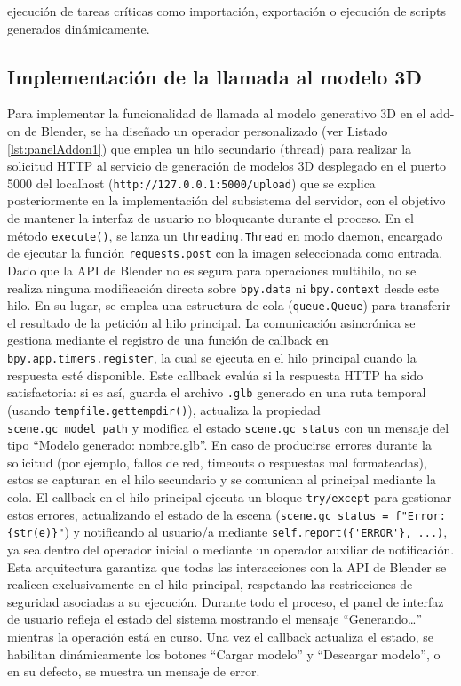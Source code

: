 ejecución de tareas críticas como importación, exportación o ejecución de scripts generados dinámicamente.




\subsection{Implementación de la llamada al modelo 3D}
Para implementar la funcionalidad de llamada al modelo generativo 3D en el add-on de Blender, se ha diseñado un operador personalizado (ver Listado \ref{lst:panelAddon1}) que emplea un hilo secundario (thread) para realizar la solicitud HTTP al servicio de generación de modelos 3D desplegado en el puerto 5000 del localhost (\verb|http://127.0.0.1:5000/upload|) que se explica posteriormente en la implementación del subsistema del servidor, con el objetivo de mantener la interfaz de usuario no bloqueante durante el proceso. En el método \verb|execute()|, se lanza un \verb|threading.Thread| en modo daemon, encargado de ejecutar la función \verb|requests.post| con la imagen seleccionada como entrada. Dado que la API de Blender no es segura para operaciones multihilo, no se realiza ninguna modificación directa sobre \verb|bpy.data| ni \verb|bpy.context| desde este hilo. En su lugar, se emplea una estructura de cola (\verb|queue.Queue|) para transferir el resultado de la petición al hilo principal. La comunicación asincrónica se gestiona mediante el registro de una función de callback en \verb|bpy.app.timers.register|, la cual se ejecuta en el hilo principal cuando la respuesta esté disponible. Este callback evalúa si la respuesta HTTP ha sido satisfactoria: si es así, guarda el archivo \verb|.glb| generado en una ruta temporal (usando \verb|tempfile.gettempdir()|), actualiza la propiedad\\ \verb|scene.gc_model_path| y modifica el estado \verb|scene.gc_status| con un mensaje del tipo “Modelo generado: nombre.glb”. En caso de producirse errores durante la solicitud (por ejemplo, fallos de red, timeouts o respuestas mal formateadas), estos se capturan en el hilo secundario y se comunican al principal mediante la cola. El callback en el hilo principal ejecuta un bloque \verb|try/except| para gestionar estos errores, actualizando el estado de la escena (\verb|scene.gc_status = f"Error: {str(e)}"|) y notificando al usuario/a mediante \verb|self.report({'ERROR'}, ...)|, ya sea dentro del operador inicial o mediante un operador auxiliar de notificación. Esta arquitectura garantiza que todas las interacciones con la API de Blender se realicen exclusivamente en el hilo principal, respetando las restricciones de seguridad asociadas a su ejecución. Durante todo el proceso, el panel de interfaz de usuario refleja el estado del sistema mostrando el mensaje “Generando…” mientras la operación está en curso. Una vez el callback actualiza el estado, se habilitan dinámicamente los botones “Cargar modelo” y “Descargar modelo”, o en su defecto, se muestra un mensaje de error.



